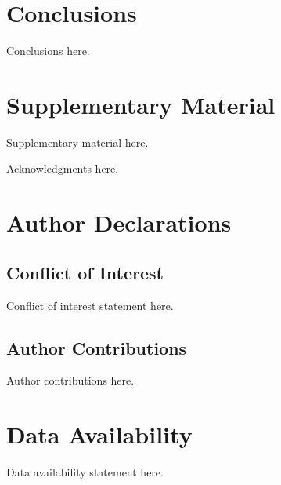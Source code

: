 \documentclass[aip,jcp,reprint,amsmath,amssymb]{revtex4-2}
\begin{document}
\section{Conclusions}
\label{sec:conclusions}
Conclusions here.

\section*{Supplementary Material}
Supplementary material here.

\begin{acknowledgments}
Acknowledgments here.
\end{acknowledgments}

\section*{Author Declarations}
\subsection*{Conflict of Interest}
Conflict of interest statement here.

\subsection*{Author Contributions}
Author contributions here.

\section*{Data Availability}
Data availability statement here.



\end{document}
